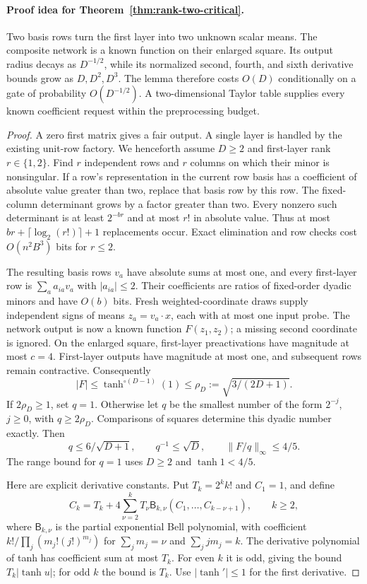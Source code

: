 \paragraph{Proof idea for Theorem~\ref{thm:rank-two-critical}.}
Two basis rows turn the first layer into two unknown scalar means. The
composite network is a known function on their enlarged square. Its output
radius decays as $D^{-1/2}$, while its normalized second, fourth, and sixth
derivative bounds grow as $D,D^2,D^3$. The lemma therefore costs $O(D)$
conditionally on a gate of probability $O(D^{-1/2})$. A two-dimensional
Taylor table supplies every known coefficient request within the
preprocessing budget.

\begin{proof}
A zero first matrix gives a fair output. A single layer is handled
by the existing unit-row factory. We henceforth assume $D\ge2$ and
first-layer rank $r\in\{1,2\}$.
Find $r$ independent rows and $r$ columns on which their minor is
nonsingular. If a row's representation in the current row basis
has a coefficient of absolute value greater than two, replace that
basis row by this row. The fixed-column determinant grows by a
factor greater than two. Every nonzero such determinant is at least
$2^{-br}$ and at most $r!$ in absolute value. Thus at most
$br+\lceil\log_2(r!)\rceil+1$ replacements occur. Exact elimination
and row checks cost $O(n^2B^3)$ bits for $r\le2$.

The resulting basis rows $v_a$ have absolute sums at most one, and
every first-layer row is $\sum_a a_{ia}v_a$ with $|a_{ia}|\le2$.
Their coefficients are ratios of fixed-order dyadic minors and have
$O(b)$ bits. Fresh weighted-coordinate draws supply independent
signs of means $z_a=v_a\cdot x$, each with at most one input probe.
The network output is now a known function $F(z_1,z_2)$; a missing
second coordinate is ignored. On the enlarged square, first-layer
preactivations have magnitude at most $c=4$. First-layer outputs have
magnitude at most one, and subsequent rows remain contractive.
Consequently
\[
 |F|\le\tanh^{\circ(D-1)}(1)
       \le\rho_D:=\sqrt{3/(2D+1)}.
\]
If $2\rho_D\ge1$, set $q=1$. Otherwise let $q$ be the smallest
number of the form $2^{-j}$, $j\ge0$, with $q\ge2\rho_D$.
Comparisons of squares determine this dyadic number exactly.
Then
\[
 q\le6/\sqrt{D+1},\qquad q^{-1}\le\sqrt D,
 \qquad \|F/q\|_\infty\le4/5.
\]
The range bound for $q=1$ uses $D\ge2$ and $\tanh1<4/5$.

Here are explicit derivative constants. Put $T_k=2^kk!$ and
$C_1=1$, and define
\[
 C_k=T_k+4\sum_{\nu=2}^kT_\nu
       \mathsf B_{k,\nu}(C_1,\ldots,C_{k-\nu+1}),
 \qquad k\ge2,
\]
where $\mathsf B_{k,\nu}$ is the partial exponential Bell
polynomial, with coefficient
$k!/\prod_j(m_j!(j!)^{m_j})$ for
$\sum_jm_j=\nu$ and $\sum_jjm_j=k$.
The derivative polynomial of tanh has coefficient sum at most $T_k$.
For even $k$ it is odd, giving the bound
$T_k|\tanh u|$; for odd $k$ the bound is $T_k$.
Use $|\tanh'|\le1$ for the first derivative.


\end{proof}
